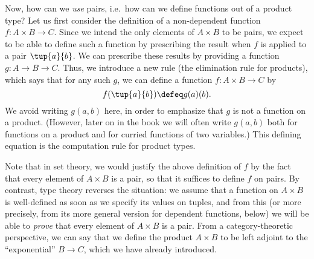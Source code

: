 Now, how can we \emph{use} pairs, i.e.\ how can we define functions out of a product type?
Let us first consider the definition of a non-dependent function $f : A\times B \to C$.
Since we intend the only elements of $A\times B$ to be pairs, we expect to be able to define such a function by prescribing the result
when $f$ is applied to a pair $\tup{a}{b}$.
We can prescribe these results by providing a function $g : A \to B \to C$.
Thus, we introduce a new rule (the elimination rule for products), which says that for any such $g$, we can define a function $f : A\times B \to C$ by
\[ f(\tup{a}{b}) \defeq g(a)(b). \]
We avoid writing $g(a,b)$ here, in order to emphasize that $g$ is not a function on a product.
(However, later on in the book we will often write $g(a,b)$ both for functions on a product and for curried functions of two variables.)
This defining equation is the computation rule for product types.

Note that in set theory, we would justify the above definition of $f$ by the fact that every element of $A\times B$ is a pair, so that it suffices to define $f$ on pairs.
By contrast, type theory reverses the situation: we assume that a function on $A\times B$ is well-defined as soon as we specify its values on tuples, and from this (or more precisely, from its more general version for dependent functions, below) we will be able to \emph{prove} that every element of $A\times B$ is a pair.
From a category-theoretic perspective, we can say that we define the product $A\times B$ to be left adjoint to the ``exponential'' $B\to C$, which we have already introduced.

